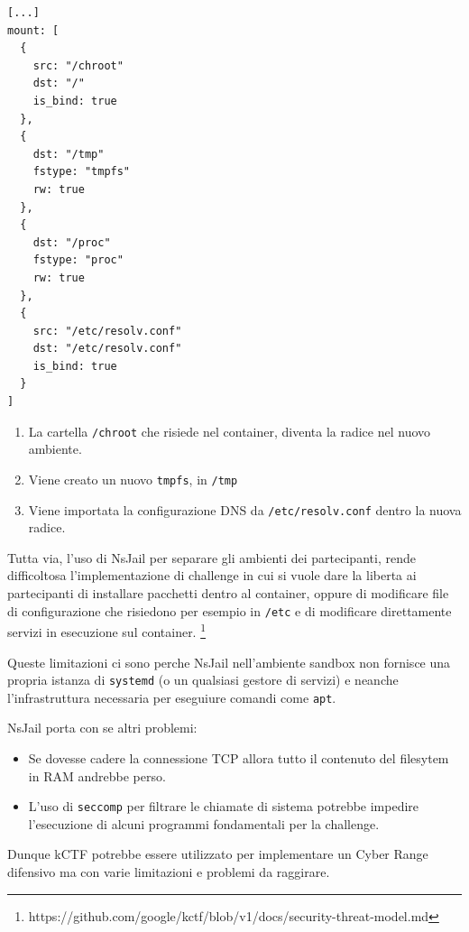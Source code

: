 \begin{lstlisting}
[...]
mount: [
  {
    src: "/chroot"
    dst: "/"
    is_bind: true
  },
  {
    dst: "/tmp"
    fstype: "tmpfs"
    rw: true
  },
  {
    dst: "/proc"
    fstype: "proc"
    rw: true
  },
  {
    src: "/etc/resolv.conf"
    dst: "/etc/resolv.conf"
    is_bind: true
  }
]
\end{lstlisting}

\begin{enumerate}
\def\labelenumi{\arabic{enumi}.}
\tightlist
\item
  La cartella \passthrough{\lstinline!/chroot!} che risiede nel
  container, diventa la radice nel nuovo ambiente.
\item
  Viene creato un nuovo \passthrough{\lstinline!tmpfs!}, in
  \passthrough{\lstinline!/tmp!}
\item
  Viene importata la configurazione DNS da
  \passthrough{\lstinline!/etc/resolv.conf!} dentro la nuova radice.
\end{enumerate}

Tutta via, l'uso di NsJail per separare gli ambienti dei partecipanti,
rende difficoltosa l'implementazione di challenge in cui si vuole dare
la liberta ai partecipanti di installare pacchetti dentro al container,
oppure di modificare file di configurazione che risiedono per esempio in
\passthrough{\lstinline!/etc!} e di modificare direttamente servizi in
esecuzione sul container. \footnote{\label{fn:ref_6}https://github.com/google/kctf/blob/v1/docs/security-threat-model.md}

Queste limitazioni ci sono perche NsJail nell'ambiente sandbox non
fornisce una propria istanza di \passthrough{\lstinline!systemd!} (o un
qualsiasi gestore di servizi) e neanche l'infrastruttura necessaria per
eseguiure comandi come \passthrough{\lstinline!apt!}.

NsJail porta con se altri problemi:

\begin{itemize}
\tightlist
\item
  Se dovesse cadere la connessione TCP allora tutto il contenuto del
  filesytem in RAM andrebbe perso.
\item
  L'uso di \passthrough{\lstinline!seccomp!} per filtrare le chiamate di
  sistema potrebbe impedire l'esecuzione di alcuni programmi
  fondamentali per la challenge.
\end{itemize}

Dunque kCTF potrebbe essere utilizzato per implementare un Cyber Range
difensivo ma con varie limitazioni e problemi da raggirare.

